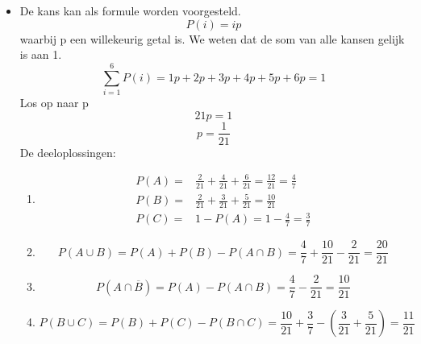 \begin{itemize}[label={}, leftmargin=*]
	    
	\item { 
		{
			De kans kan als formule worden voorgesteld.
			$$P(i) = ip$$
			waarbij p een willekeurig getal is.
			We weten dat de som van alle kansen gelijk is aan 1.
			$$\sum_{i = 1}^{6} P(i) = 1p + 2p + 3p + 4p + 5p + 6p = 1$$
			Los op naar p
			$$21p = 1$$
			$$p = \frac{1}{21}$$
			De deeloplossingen:
			\begin{enumerate}
				\item   \begin{equation*}
				      \begin{split}
				      	P(A) = & \frac{2}{21} + \frac{4}{21} + \frac{6}{21} = \frac{12}{21} = \frac{4}{7}\\
				      	P(B) = &\frac{2}{21} + \frac{3}{21} + \frac{5}{21} = \frac{10}{21}\\
				      	P(C) = & 1 - P(A) = 1 - \frac{4}{7} = \frac{3}{7}
				      \end{split}
				\end{equation*}
				\item $$P(A\cup B) = P(A) + P(B) - P(A \cap B) = \frac{4}{7} +\frac{10}{21} - \frac{2}{21} = \frac{20}{21}$$
				\item $$P(A \cap \overline{B}) = P(A) - P(A \cap B) = \frac{4}{7} - \frac{2}{21} = \frac{10}{21}$$
				\item $$P(B \cup C) = P(B) + P(C) - P(B \cap C) = \frac{10}{21} + \frac{3}{7} - (\frac{3}{21} + \frac{5}{21}) = \frac{11}{21}$$
			\end{enumerate}}}
	  

\end{itemize}
